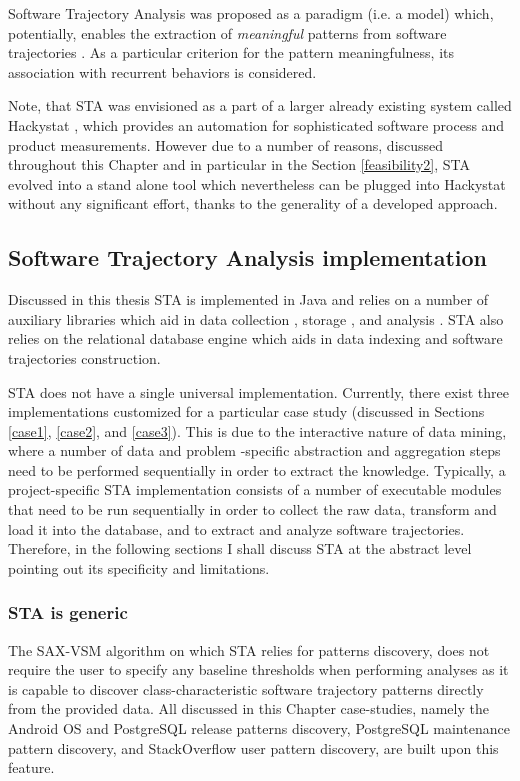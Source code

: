 Software Trajectory Analysis was proposed as a paradigm (i.e. a model) which, potentially, enables the extraction of \textit{meaningful} patterns from software trajectories \cite{citeulike:13159603}. As a particular criterion for the pattern meaningfulness, its association with recurrent behaviors is considered. 

Note, that STA was envisioned as a part of a larger already existing system called Hackystat \cite{citeulike:12550871}, which provides an automation for sophisticated software process and product measurements. However due to a number of reasons, discussed throughout this Chapter and in particular in the Section \ref{feasibility2}, STA evolved into a stand alone tool which nevertheless can be plugged into Hackystat without any significant effort, thanks to the generality of a developed approach.

\subsection{Software Trajectory Analysis implementation}
Discussed in this thesis STA is implemented in Java and relies on a number of auxiliary libraries which aid in data collection \cite{jgit}, storage \cite{mybatis}, and analysis \cite{sax-vsm}. STA also relies on the relational database engine which aids in data indexing and software trajectories construction. 

STA does not have a single universal implementation. Currently, there exist three implementations customized for a particular case study (discussed in Sections \ref{case1}, \ref{case2}, and \ref{case3}). This is due to the interactive nature of data mining, where a number of data and problem -specific abstraction and aggregation steps need to be performed sequentially in order to extract the knowledge. Typically, a project-specific STA implementation consists of a number of executable modules that need to be run sequentially in order to collect the raw data, transform and load it into the database, and to extract and analyze software trajectories. Therefore, in the following sections I shall discuss STA at the abstract level pointing out its specificity and limitations.

\subsubsection{STA is generic}
The \mbox{SAX-VSM} algorithm on which STA relies for patterns discovery, does not require the user to specify any baseline thresholds when performing analyses as it is capable to discover class-characteristic software trajectory patterns directly from the provided data. All discussed in this Chapter case-studies, namely the Android OS and PostgreSQL release patterns discovery,  PostgreSQL maintenance pattern discovery, and StackOverflow user pattern discovery, are built upon this feature.

